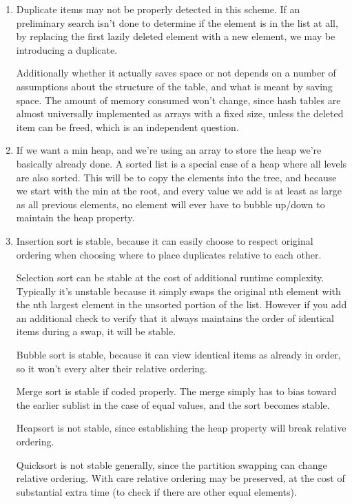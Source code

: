 \documentclass[12pt]{chmullighw}
\begin{document}
\begin{enumerate}
\item Duplicate items may not be properly detected in this scheme. If an
preliminary search isn't done to determine if the element is in the list at all,
by replacing the first lazily deleted element with a new element, we may be
introducing a duplicate.

Additionally whether it actually saves space or not depends on a number of
assumptions about the structure of the table, and what is meant by saving space.
The amount of memory consumed won't change, since hash tables are almost
universally implemented as arrays with a fixed size, unless the deleted item can
be freed, which is an independent question.

\item If we want a min heap, and we're using an array to store the heap we're
basically already done. A sorted list is a special case of a heap where all
levels are also sorted. This will be  to copy the elements into the
tree, and because we start with the min at the root, and every value we add is
at least as large as all previous elements, no element will ever have to bubble
up/down to maintain the heap property.

\item Insertion sort is stable, because it can easily choose to respect original
ordering when choosing where to place duplicates relative to each other.

Selection sort can be stable at the cost of additional runtime complexity.
Typically it's unstable because it simply swaps the original nth element with
the nth largest element in the unsorted portion of the list. However if you add
an additional check to verify that it always maintains the order of identical
items during a swap, it will be stable.

Bubble sort is stable, because it can view identical items as already in order,
so it won't every alter their relative ordering.

Merge sort is stable if coded properly. The merge simply has to bias toward the
earlier sublist in the case of equal values, and the sort becomes stable.

Heapsort is not stable, since establishing the heap property will break relative
ordering.

Quicksort is not stable generally, since the partition swapping can change
relative ordering. With care relative ordering may be preserved, at the cost of
substantial extra time (to check if there are other equal elements).


\end{enumerate}
\end{document}
